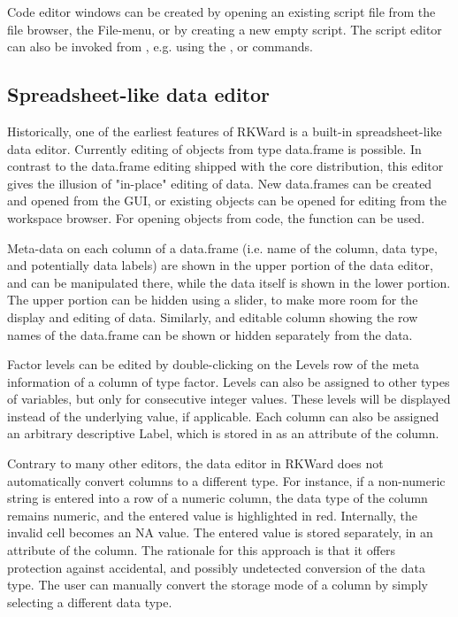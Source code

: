 Code editor windows can be created by opening an existing
 script file from the file browser, the
File-menu, or by creating a new empty script. The script editor can
also be invoked from , e.g. using the
,  or 
commands.

\subsection{Spreadsheet-like data editor}
\label{sec:spreadsheet}

Historically, one of the earliest
features of RKWard is a built-in spreadsheet-like data editor.
Currently editing of  objects from type
data.frame is possible. In contrast to the data.frame editing shipped
with the  core distribution, this editor
gives the illusion of "in-place" editing of data. New data.frames can
be created and opened from the GUI, or existing objects can be opened
for editing from the workspace browser. For opening objects from
 code, the function
 can be used.

Meta-data on each column of a data.frame (i.e. name of the column, data
type, and potentially data labels) are shown in the upper portion of
the data editor, and can be manipulated there, while the data itself is
shown in the lower portion. The upper portion can be hidden using a
slider, to make more room for the display and editing of data.
Similarly, and editable column showing the row names of the data.frame
can be shown or hidden separately from the data.

Factor levels can be edited by double-clicking on the
Levels row of the meta information of a
column of type factor. Levels can also be assigned to other types of
variables, but only for consecutive integer values. These levels will
be displayed instead of the underlying value, if applicable. Each
column can also be assigned an arbitrary descriptive
Label, which is stored in
 as an attribute of the column.

Contrary to many other editors, the data editor in RKWard does not
automatically convert columns to a different type. For instance, if a
non-numeric string is entered into a row of a numeric column, the data
type of the column remains numeric, and the entered value is
highlighted in red. Internally, the invalid cell becomes an NA value.
The entered value is stored separately, in an attribute of the column.
The rationale for this approach is that it offers protection against
accidental, and possibly undetected conversion of the data type. The
user can manually convert the storage mode of a column by simply
selecting a different data type.

